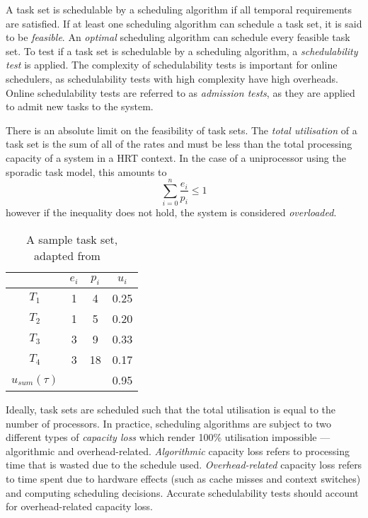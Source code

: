 A task set is schedulable by a scheduling algorithm if all temporal requirements are satisfied.
If at least one scheduling algorithm can schedule a task set, it is said to be \emph{feasible}.
An \emph{optimal} scheduling algorithm can schedule every feasible task set.
To test if a task set is schedulable by a scheduling algorithm, a \emph{schedulability test} is applied.
The complexity of schedulability tests is important for online schedulers, as schedulability tests with high complexity have high overheads.
Online schedulability tests are referred to as \emph{admission tests}, as they are applied to admit new tasks to the system.

There is an absolute limit on the feasibility of task sets.
The \emph{total utilisation} of a task set is the sum of all of the rates and must be less than the total processing capacity of a system in a \gls{HRT} context.
In the case of a uniprocessor using the sporadic task model, this amounts to
\begin{equation*}
	\sum\limits_{i=0}^n \dfrac{e_{i}}{p_{i}} \leq 1
\end{equation*}
however if the inequality does not hold, the system is considered \emph{overloaded}.

\begin{table}
    \centering
    \begin{tabular}{cccc} \toprule
        & \emph{$e_{i}$} & $p_{i}$ & $u_{i} $ \\ \midrule
			$ T_{1}$ & 1 & 4 & 0.25 \\
			$ T_{2}$ & 1 & 5 & 0.20 \\
			$ T_{3}$ & 3 & 9 & 0.33 \\
			$ T_{4}$ & 3 & 18 & 0.17  \\\midrule 
	$ u_{sum}(\tau)$ & &  & 0.95 \\ \bottomrule
	\end{tabular}
	\caption{A sample task set, adapted from ~\citep{Brandenburg:phd}}
	\label{tab:example_task_set}
\end{table}

Ideally, task sets are scheduled such that the total utilisation is equal to the number of processors.
In practice, scheduling algorithms are subject to two different types of \emph{capacity loss} which render 100\% utilisation impossible --- algorithmic and overhead-related.
\emph{Algorithmic} capacity loss refers to processing time that is wasted due to the schedule used.
\emph{Overhead-related} capacity loss refers to time spent due to hardware effects (such as cache misses and context switches) and computing scheduling decisions.
Accurate schedulability tests should account for overhead-related capacity loss.

